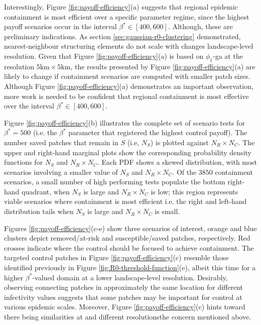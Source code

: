 Interestingly, Figure \ref{fig:payoff-efficiency}(a) suggests that regional epidemic containment is most efficient over a specific parameter regime,
since the highest payoff scenarios occur in the interval $\beta^* \in [400, 600]$.
Although, these are preliminary indications. 
As section \ref{sec:gaussian-r0-clustering} demonstrated, nearest-neighbour structuring elements do not scale with changes landscape-level resolution.
Given that Figure \ref{fig:payoff-efficiency}(a) is based on $\phi_1$-ga at the resolution $5\mathrm{km} \times 5\mathrm{km}$, the results presented by Figure \ref{fig:payoff-efficiency}(a)
are likely to change if containment scenarios are computed with smaller patch sizes.
Although Figure \ref{fig:payoff-efficiency}(a) demonstrates an important observation, 
more work is needed to be confident that regional containment is most effective over the interval $\beta^* \in [400, 600]$.

Figure \ref{fig:payoff-efficiency}(b) illustrates the complete set of scenario tests for $\beta^*=500$ (i.e. the $\beta^*$ parameter that registered the highest control payoff).
The number saved patches that remain in $S$ (i.e, $N_S$) is plotted against $N_R \times N_C$.
The upper and right-hand marginal plots show the corresponding probability density functions for $N_S$ and $N_R \times N_C$.
Each PDF shows a skewed distribution, with most scenarios involving a smaller value of $N_S$ and $N_R \times N_C$.
Of the $3850$ containment scenarios, a small number of high performing tests populate the bottom right-hand quadrant, when $N_S$ is large and $N_R \times N_C$ is low;
this region represents viable scenarios where containment is most efficient i.e. the right and left-hand distribution tails when $N_S$ is large and $N_R \times N_C$ is small.

Figures \ref{fig:payoff-efficiency}(c-e) show three scenarios of interest, orange and blue clusters depict removed/at-risk and susceptible/saved patches, respectively. 
Red crosses indicate where the control should be focused to achieve containment. 
The targeted control patches in Figure \ref{fig:payoff-efficiency}(c) resemble those identified previously in Figure \ref{fig:R0-threshold-function}(e), albeit this time for a higher $\beta^*$-valued domain at a lower landscape-level resolution.
Desirably, observing connecting patches in approximately the same location for different infectivity values suggests that some patches may be important for control at various epidemic scales.
Moreover, Figure \ref{fig:payoff-efficiency}(c) hints toward there being similarities at and different resolutions\textemdash the concern mentioned above.

